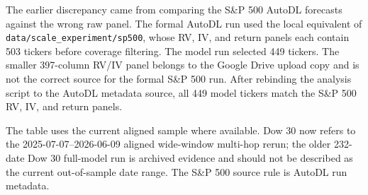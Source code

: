 \documentclass[11pt,a4paper]{article}
\begin{document}
The earlier discrepancy came from comparing the S\&P 500 AutoDL forecasts against the wrong raw panel.  The formal AutoDL run used the local equivalent of \texttt{data/scale\_experiment/sp500}, whose RV, IV, and return panels each contain 503 tickers before coverage filtering.  The model run selected 449 tickers.  The smaller 397-column RV/IV panel belongs to the Google Drive upload copy and is not the correct source for the formal S\&P 500 run.  After rebinding the analysis script to the AutoDL metadata source, all 449 model tickers match the S\&P 500 RV, IV, and return panels.

\begin{table}[H]
\centering
\caption{Run-level sample summary}
\label{tab:sample-summary}
\scriptsize
{}

\vspace{2pt}\begin{minipage}{0.98\textwidth}\footnotesize The table uses the current aligned sample where available. Dow 30 now refers to the 2025-07-07--2026-06-09 aligned wide-window multi-hop rerun; the older 232-date Dow 30 full-model run is archived evidence and should not be described as the current out-of-sample date range. The S\&P 500 source rule is AutoDL run metadata.\end{minipage}
\end{table}
\end{document}
